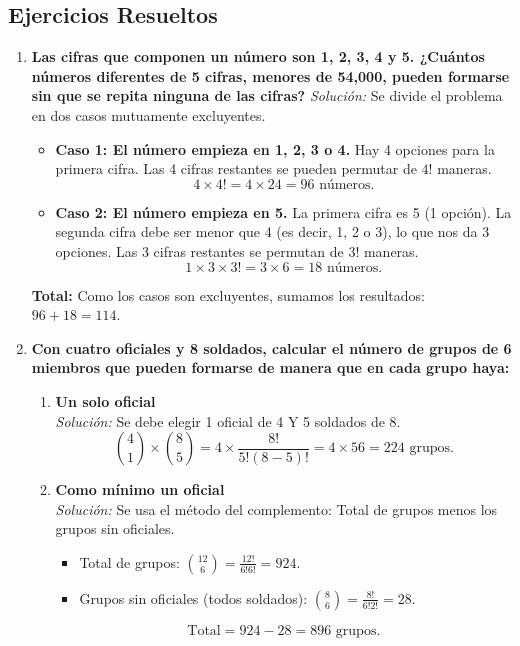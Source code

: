 \documentclass[12pt, letterpaper]{article}
\begin{document}
\subsection{Ejercicios Resueltos}
\begin{enumerate}
    \item \textbf{Las cifras que componen un número son 1, 2, 3, 4 y 5. ¿Cuántos números diferentes de 5 cifras, menores de 54,000, pueden formarse sin que se repita ninguna de las cifras?}
	\textit{Solución:} Se divide el problema en dos casos mutuamente excluyentes.
	\begin{itemize}
		\item \textbf{Caso 1: El número empieza en 1, 2, 3 o 4.} Hay 4 opciones para la primera cifra. Las 4 cifras restantes se pueden permutar de $4!$ maneras.
		      \[ 4 \times 4! = 4 \times 24 = 96 \text{ números.} \]
		\item \textbf{Caso 2: El número empieza en 5.} La primera cifra es 5 (1 opción). La segunda cifra debe ser menor que 4 (es decir, 1, 2 o 3), lo que nos da 3 opciones. Las 3 cifras restantes se permutan de $3!$ maneras.
		      \[ 1 \times 3 \times 3! = 3 \times 6 = 18 \text{ números.} \]
	\end{itemize}
	\textbf{Total:} Como los casos son excluyentes, sumamos los resultados: $96 + 18 = 114$.

    \item \textbf{Con cuatro oficiales y 8 soldados, calcular el número de grupos de 6 miembros que pueden formarse de manera que en cada grupo haya:}
	\begin{enumerate}
		\item \textbf{Un solo oficial} \\
		      \textit{Solución:} Se debe elegir 1 oficial de 4 Y 5 soldados de 8.
		      \[ \binom{4}{1} \times \binom{8}{5} = 4 \times \frac{8!}{5!(8-5)!} = 4 \times 56 = 224 \text{ grupos.} \]
		\item \textbf{Como mínimo un oficial} \\
		      \textit{Solución:} Se usa el método del complemento: Total de grupos menos los grupos sin oficiales.
		      \begin{itemize}
			      \item Total de grupos: $\binom{12}{6} = \frac{12!}{6!6!} = 924$.
			      \item Grupos sin oficiales (todos soldados): $\binom{8}{6} = \frac{8!}{6!2!} = 28$.
		      \end{itemize}
		      \[ \text{Total} = 924 - 28 = 896 \text{ grupos.} \]
	\end{enumerate}


\end{enumerate}
\end{document}
